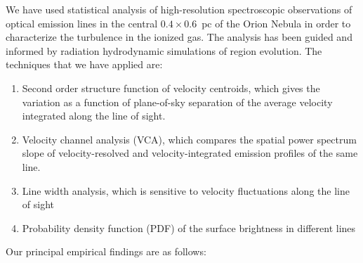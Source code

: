 \documentclass[useAMS,usenatbib]{mn2e}
\begin{document}
We have used statistical analysis of high-resolution spectroscopic
observations of optical emission lines in the central
\(0.4 \times 0.6\)~pc of the Orion Nebula in order to characterize the
turbulence in the ionized gas. The analysis has been guided and
informed by radiation hydrodynamic simulations of \hii{} region
evolution. The techniques that we have applied are:
\begin{enumerate}
\item Second order structure function of velocity centroids, which
  gives the variation as a function of plane-of-sky separation of the
  average velocity integrated along the line of sight.
\item Velocity channel analysis (VCA), which compares the spatial
  power spectrum slope of velocity-resolved and velocity-integrated
  emission profiles of the same line.
\item Line width analysis, which is sensitive to velocity fluctuations
  along the line of sight
\item Probability density function (PDF) of the surface brightness in
  different lines
\end{enumerate}
Our principal empirical findings are as follows:
\end{document}
